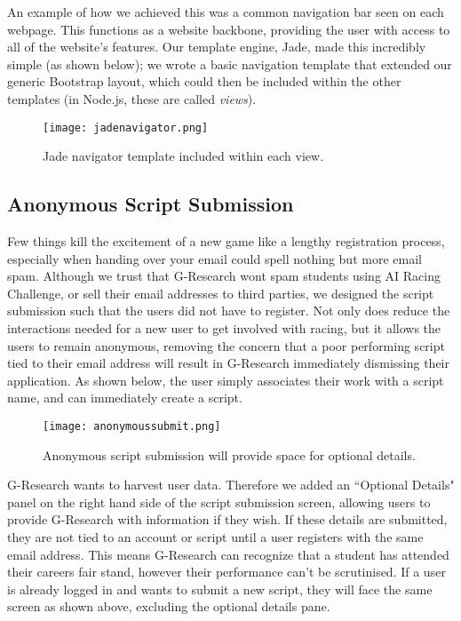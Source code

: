 An example of how we achieved this was a common navigation bar seen on each webpage. This functions as a website backbone, providing the user with access to all of the website's  features. Our template engine, Jade, made this incredibly simple (as shown below); we wrote a basic navigation template that extended our generic Bootstrap layout, which could then be included within the other templates (in Node.js, these are called {\it views}). 

\begin{figure}[H]
\centering
\texttt{[image: jadenavigator.png]}
\caption{Jade navigator template included within each view.}
\end{figure}

\subsection{Anonymous Script Submission}

Few things kill the excitement of a new game like a lengthy registration process, especially when handing over your email could spell nothing but more email spam. Although we trust that G-Research wont spam students using AI Racing Challenge, or sell their email addresses to third parties, we designed the script submission such that the users did not have to register. Not only does reduce the interactions needed for a new user to get involved with racing, but it allows the users to remain anonymous, removing the concern that a poor performing script tied to their email address will result in G-Research immediately dismissing their application. As shown below, the user simply associates their work with a script name, and can immediately create a script.

\begin{figure}[H]
\centering
\texttt{[image: anonymoussubmit.png]}
\caption{Anonymous script submission will provide space for optional details.}
\end{figure}

G-Research wants to harvest user data.  Therefore we added an ``Optional Details" panel on the right hand side of the script submission screen, allowing users to provide G-Research with information if they wish. If these details are submitted, they are not tied to an account or script until a user registers with the same email address. This means G-Research can recognize that a student has attended their careers fair stand, however their performance can't be scrutinised. If a user is already logged in and wants to submit a new script, they will face the same screen as shown above, excluding the optional details pane.

